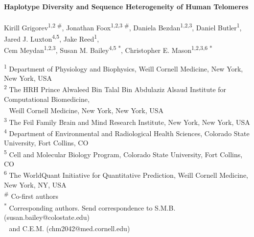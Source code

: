 \documentclass{article}
\begin{document}
\begin{center}
    \Large{\textbf{Haplotype Diversity and Sequence Heterogeneity of Human Telomeres}}
    \\~\\
    \small{
        Kirill Grigorev\textsuperscript{1,2 \#},
        Jonathan Foox\textsuperscript{1,2,3 \#},
        Daniela Bezdan\textsuperscript{1,2,3},
        Daniel Butler\textsuperscript{1},
        Jared J. Luxton\textsuperscript{4,5},
        Jake Reed\textsuperscript{1},
        \\
        Cem Meydan\textsuperscript{1,2,3},
        Susan M. Bailey\textsuperscript{4,5 *},
        Christopher E. Mason\textsuperscript{1,2,3,6 *}
    }
\end{center}

\small{ \noindent
    \textsuperscript{1} Department of Physiology and Biophysics, Weill Cornell Medicine, New York, New York, USA
    \\
    \textsuperscript{2} The HRH Prince Alwaleed Bin Talal Bin Abdulaziz Alsaud Institute for Computational Biomedicine, \\
    \textcolor{white}{\textsuperscript{2}} Weill Cornell Medicine, New York, New York, USA
    \\
    \textsuperscript{3} The Feil Family Brain and Mind Research Institute, New York, New York, USA
    \\
    \textsuperscript{4} Department of Environmental and Radiological Health Sciences, Colorado State University, Fort Collins, CO
    \\
    \textsuperscript{5} Cell and Molecular Biology Program, Colorado State University, Fort Collins, CO
    \\
    \textsuperscript{6} The WorldQuant Initiative for Quantitative Prediction, Weill Cornell Medicine, New York, NY, USA
    \\
    \textsuperscript{\#} Co-first authors
    \\
    \textsuperscript{*} Corresponding authors. Send correspondence to S.M.B. (susan.bailey@colostate.edu) \\
    \textcolor{white}{\textsuperscript{*}} and C.E.M. (chm2042@med.cornell.edu)
}

\normalsize
\doublespacing
\end{document}
